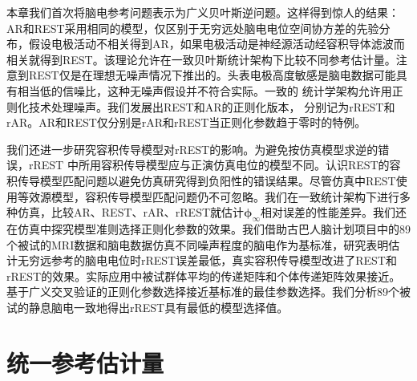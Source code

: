 本章我们首次将脑电参考问题表示为广义贝叶斯逆问题。这样得到惊人的结果：AR和REST采用相同的模型，仅区别于无穷远处脑电电位空间协方差的先验分布，假设电极活动不相关得到AR，如果电极活动是神经源活动经容积导体滤波而相关就得到REST。该理论允许在一致贝叶斯统计架构下比较不同参考估计量。注意到REST仅是在理想无噪声情况下推出的。头表电极高度敏感是脑电数据可能具有相当低的信噪比，这种无噪声假设并不符合实际。一致的
统计学架构允许用正则化技术处理噪声。我们发展出REST和AR的正则化版本，
分别记为rREST和rAR。AR和REST仅分别是rAR和rREST当正则化参数趋于零时的特例。

我们还进一步研究容积传导模型对rREST的影响。为避免按仿真模型求逆的错误，rREST
中所用容积传导模型应与正演仿真电位的模型不同。认识REST的容积传导模型匹配问题以避免仿真研究得到负阳性的错误结果。尽管仿真中REST使用等效源模型，容积传导模型匹配问题仍不可忽略。我们在一致统计架构下进行多种仿真，比较AR、REST、rAR、rREST就估计$\mathbf{\phi}_\infty$相对误差的性能差异。我们还在仿真中探究模型准则选择正则化参数的效果。我们借助古巴人脑计划项目中的89个被试的MRI数据和脑电数据仿真不同噪声程度的脑电作为基标准，研究表明估计无穷远参考的脑电电位时rREST误差最低，真实容积传导模型改进了REST和rREST的效果。实际应用中被试群体平均的传递矩阵和个体传递矩阵效果接近。基于广义交叉验证的正则化参数选择接近基标准的最佳参数选择。我们分析89个被试的静息脑电一致地得出rREST具有最低的模型选择值。

\section{统一参考估计量}
